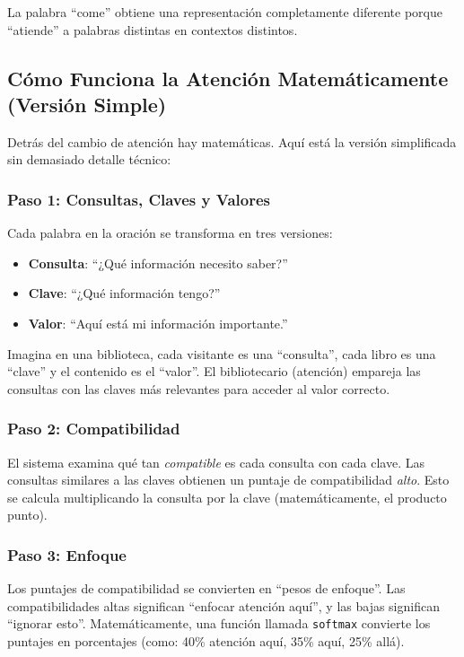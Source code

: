 La palabra ``come'' obtiene una representación completamente diferente porque ``atiende'' a palabras distintas en contextos distintos.

\subsection{Cómo Funciona la Atención Matemáticamente (Versión Simple)}

Detrás del cambio de atención hay matemáticas. Aquí está la versión simplificada sin demasiado detalle técnico:

\subsubsection{Paso 1: Consultas, Claves y Valores}

Cada palabra en la oración se transforma en tres versiones:
\begin{itemize}[leftmargin=*]
    \item \textbf{Consulta}: ``¿Qué información necesito saber?''
    \item \textbf{Clave}: ``¿Qué información tengo?''
    \item \textbf{Valor}: ``Aquí está mi información importante.''
\end{itemize}

Imagina en una biblioteca, cada visitante es una ``consulta'', cada libro es una ``clave'' y el contenido es el ``valor''. El bibliotecario (atención) empareja las consultas con las claves más relevantes para acceder al valor correcto.

\subsubsection{Paso 2: Compatibilidad}

El sistema examina qué tan \emph{compatible} es cada consulta con cada clave. Las consultas similares a las claves obtienen un puntaje de compatibilidad \emph{alto}. Esto se calcula multiplicando la consulta por la clave (matemáticamente, el producto punto).

\subsubsection{Paso 3: Enfoque}

Los puntajes de compatibilidad se convierten en ``pesos de enfoque''. Las compatibilidades altas significan ``enfocar atención aquí'', y las bajas significan ``ignorar esto''. Matemáticamente, una función llamada \texttt{softmax} convierte los puntajes en porcentajes (como: 40\% atención aquí, 35\% aquí, 25\% allá).

